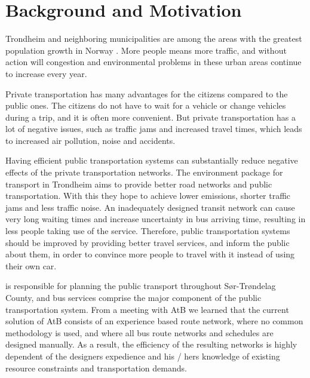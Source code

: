 \section{Background and Motivation}

Trondheim and neighboring municipalities are among the areas with the greatest population growth in Norway \citep{website:miljopakken}. More people means more traffic, and without action will congestion and environmental problems in these urban areas continue to increase every year. 

Private transportation has many advantages for the citizens compared to the public ones. The citizens do not have to wait for a vehicle or change vehicles during a trip, and it is often more convenient. But private transportation has a lot of negative issues, such as traffic jams and increased travel times, which leads to increased air pollution, noise and accidents. 

Having efficient public transportation systems can substantially reduce negative effects of the private transportation networks. The environment package \citep{website:miljopakken} for transport in Trondheim aims to provide better road networks and public transportation. With this they hope to achieve lower emissions, shorter traffic jams and less traffic noise. An inadequately designed transit network can cause very long waiting times and increase uncertainty in bus arriving time, resulting in less people taking use of the service. Therefore, public transportation systems should be improved by providing better travel services, and inform the public about them, in order to convince more people to travel with it instead of using their own car. 

\citet{website:atb} is responsible for planning the public transport throughout Sør-Trøndelag County, and bus services comprise the major component of the public transportation system. From a meeting with AtB we learned that the current solution of AtB consists of an experience based route network, where no common methodology is used, and where all bus route networks and schedules are designed manually. As a result, the efficiency of the resulting networks is highly dependent of the designers expedience and his / hers knowledge of existing resource constraints and transportation demands. 

